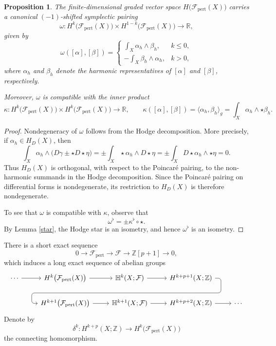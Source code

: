 \documentclass[12pt]{amsart}
\numberwithin{table}{section}
\numberwithin{equation}{section}
\newtheorem{prop}{Proposition}[section]
\theoremstyle{plain}
\newcommand{\sF}{\mathcal{F}}
\newcommand{\R}{\mathbb{R}}
\newcommand{\Z}{\mathbb{Z}}
\begin{document}
\begin{prop}
	The finite-dimensional graded vector space $H\bigl(\sF_{\mathrm{pert}}(X)\bigr)$ carries a canonical $(-1)$-shifted symplectic pairing
	\[
	\omega\colon
	H^k\!\bigl(\sF_{\mathrm{pert}}(X)\bigr)
	\times
	H^{1-k}\!\bigl(\sF_{\mathrm{pert}}(X)\bigr)
	\longrightarrow \R,
	\]
	given by
	\[
	\omega([\alpha],[\beta])
	=
	\begin{cases}
		\displaystyle \int_X \alpha_h\wedge\beta_h, & k\leq 0,\\[6pt]
		\displaystyle -\int_X \beta_h\wedge\alpha_h, & k>0,
	\end{cases}
	\]
	where $\alpha_h$ and $\beta_h$ denote the harmonic representatives of
	$[\alpha]$ and $[\beta]$, respectively.
	
	Moreover, $\omega$ is compatible with the inner product
	\[
	\kappa\colon
	H^k\!\bigl(\sF_{\mathrm{pert}}(X)\bigr)
	\times
	H^k\!\bigl(\sF_{\mathrm{pert}}(X)\bigr)
	\longrightarrow \R,
	\qquad
	\kappa([\alpha],[\beta])
	=
	\langle \alpha_h,\beta_h\rangle_g
	=
	\int_X \alpha_h\wedge\star\beta_h.
	\]
\end{prop}

\begin{proof}
	Nondegeneracy of $\omega$ follows from the Hodge decomposition. More precisely,
	if $\alpha_h\in H_D(X)$, then
	\[
	\int_X \alpha_h\wedge\bigl(D\gamma\pm\star D\star\eta\bigr)
	=
	\pm\int_X \star\alpha_h\wedge D\star\eta
	=
	\pm\int_X D\star\alpha_h\wedge\star\eta
	=
	0.
	\]
	Thus $H_D(X)$ is orthogonal, with respect to the Poincar\'e pairing, to the non-harmonic summands in the Hodge decomposition. Since the Poincar\'e pairing on differential forms is nondegenerate, its restriction to $H_D(X)$ is therefore nondegenerate.
	
	To see that $\omega$ is compatible with $\kappa$, observe that
	\[
	\omega^\flat=\pm \kappa^\flat \circ \star.
	\]
	By Lemma \ref{star}, the Hodge star is an isometry, and hence $\omega^\flat$ is an isometry.
\end{proof}

There is a short exact sequence 
\[
0\longrightarrow \sF_{\mathrm{pert}}
\longrightarrow \sF
\longrightarrow \Z[p+1]
\longrightarrow 0,
\]
which induces a long exact sequence of abelian groups
\[
\begin{tikzcd}
	\cdots \arrow[r]
	&
	H^k\bigl(\sF_{\mathrm{pert}}(X)\bigr) \arrow[r]
	&
	\mathbb H^k(X;\sF) \arrow[r]
	&
	H^{k+p+1}(X;\Z)
	\arrow[dll, "\delta"', rounded corners, to path={
		-- ([xshift=2ex]\tikztostart.east)
		|- ([yshift=-3ex]\tikztostart.south)
		-| ([xshift=-2ex]\tikztotarget.west)
		-- (\tikztotarget)
	}]
	\\
	&
	H^{k+1}\bigl(\sF_{\mathrm{pert}}(X)\bigr) \arrow[r]
	&
	\mathbb H^{k+1}(X;\sF) \arrow[r]
	&
	H^{k+p+2}(X;\Z) \arrow[r]
	&
	\cdots
\end{tikzcd}
\]
Denote by
\[
\delta^k:H^{k+p}(X;\Z)\longrightarrow H^k\!\bigl(\sF_{\mathrm{pert}}(X)\bigr)
\]
the connecting homomorphism. 
\end{document}
